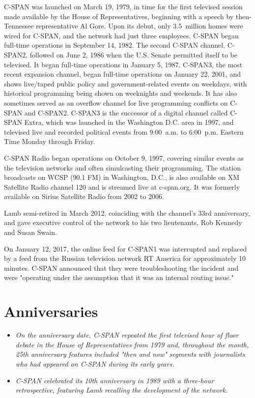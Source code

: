 C-SPAN was launched on March 19, 1979, in time for the first televised
session made available by the House of Representatives, beginning with a
speech by then-Tennessee representative Al Gore. Upon its debut, only
3.5~million homes were wired for C-SPAN, and the network had just three
employees. C-SPAN began full-time operations in September 14, 1982. The
second C-SPAN channel, C-SPAN2, followed on June 2, 1986 when the U.S.
Senate permitted itself to be televised. It began full-time operations
in January 5, 1987. C-SPAN3, the most recent expansion channel, began
full-time operations on January 22, 2001, and shows live/taped public
policy and government-related events on weekdays, with historical
programming being shown on weeknights and weekends. It has also
sometimes served as an overflow channel for live programming conflicts
on C-SPAN and C-SPAN2. C-SPAN3 is the successor of a digital channel
called C-SPAN Extra, which was launched in the Washington D.C. area in
1997, and televised live and recorded political events from 9:00~a.m. to
6:00~p.m. Eastern Time Monday through Friday.

C-SPAN Radio began operations on October 9, 1997, covering similar
events as the television networks and often simulcasting their
programming. The station broadcasts on WCSP (90.1 FM) in Washington,
D.C., is also available on XM Satellite Radio channel 120 and is
streamed live at c-span.org. It was formerly available on Sirius
Satellite Radio from 2002 to 2006.

Lamb semi-retired in March 2012, coinciding with the channel's 33rd
anniversary, and gave executive control of the network to his two
lieutenants, Rob Kennedy and Susan Swain.

On January 12, 2017, the online feed for C-SPAN1 was interrupted and
replaced by a feed from the Russian television network RT America for
approximately 10 minutes. C-SPAN announced that they were
troubleshooting the incident and were "operating under the assumption
that it was an internal routing issue."

\section{Anniversaries}\label{anniversaries}

\begin{itemize}
\item
  \emph{On the anniversary date, C-SPAN repeated the first televised
  hour of floor debate in the House of Representatives from 1979 and,
  throughout the month, 25th anniversary features included "then and
  now" segments with journalists who had appeared on C-SPAN during its
  early years.}
\item
  \emph{C-SPAN celebrated its 10th anniversary in 1989 with a three-hour
  retrospective, featuring Lamb recalling the development of the
  network.}
\end{itemize}

